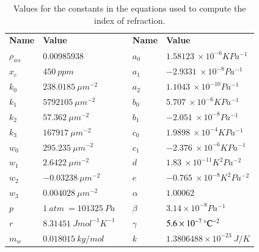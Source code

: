 \begin{table}[htbp!]
\centering
\caption{Values for the constants in the equations used to compute the index of refraction.}
\label{tb:ciddor_constants}
\begin{tabular}{|l|l|l|l|l|}
\cline{1-2} \cline{4-5}
\textbf{Name}        & \textbf{Value}                       &  & \textbf{Name}     & \textbf{Value}                                \\ \cline{1-2} \cline{4-5} 
$\rho_{ws}$ & 0.00985938                  &  & $a_0$    & $1.58123~\times 10 ^{-6} K Pa^{-1}$  \\ \cline{1-2} \cline{4-5} 
$x_c$       & $450~ppm$                   &  & $a_1$    & $-2.9331 ~\times 10 ^{-8} Pa^{-1}$   \\ \cline{1-2} \cline{4-5} 
$k_0$       & $238.0185~\mu m^{-2}$       &  & $a_2$    & $1.1043 ~\times 10 ^{-10} Pa^{-1}$   \\ \cline{1-2} \cline{4-5} 
$k_1$       & $5792105~\mu m^{-2}$        &  & $b_0$    & $5.707~\times 10 ^{-6} K Pa^{-1}$    \\ \cline{1-2} \cline{4-5} 
$k_2$       & $57.362~\mu m^{-2}$         &  & $b_1$    & $-2.051~\times 10 ^{-8} Pa^{-1}$     \\ \cline{1-2} \cline{4-5} 
$k_3$       & $167917~\mu m^{-2}$         &  & $c_0$    & $1.9898~\times 10 ^{-4} K Pa^{-1}$   \\ \cline{1-2} \cline{4-5} 
$w_0$       & $295.235~\mu m^{-2}$        &  & $c_1$    & $-2.376~\times 10 ^{-6} K Pa^{-1}$   \\ \cline{1-2} \cline{4-5} 
$w_1$       & $2.6422~\mu m^{-2}$         &  & $d$      & $1.83~\times 10 ^{-11} K^2 Pa^{-2}$  \\ \cline{1-2} \cline{4-5} 
$w_2$       & $-0.03238~\mu m^{-2}$       &  & $e$      & $-0.765~\times 10 ^{-8} K^2 Pa^{-2}$ \\ \cline{1-2} \cline{4-5} 
$w_3$       & $0.004028~\mu m^{-2}$       &  & $\alpha$ & $1.00062$                            \\ \cline{1-2} \cline{4-5} 
$p$         & $1~atm~ = 101 325~Pa$       &  & $\beta$  & $3.14 \times 10^{-8} Pa^{-1}$        \\ \cline{1-2} \cline{4-5} 
$r$         & $8.31451~J mol^{-1} K^{-1}$ &  & $\gamma$ & $5.6 \times 10^{-7} \,^{\circ}{\rm C}^{-2}$         \\ \cline{1-2} \cline{4-5} 
$m_w$       & $0.018015~kg/mol$           &  & $k$      & $1.3806488 \times 10^{-23}~J/K$      \\ \cline{1-2} \cline{4-5} 

\end{tabular}
\end{table}
